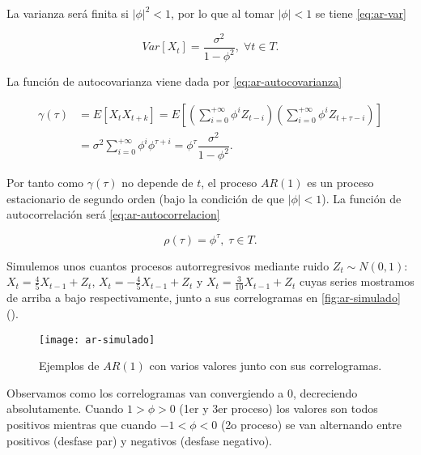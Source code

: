 La varianza será finita si $|\phi|^2 < 1$, por lo que al tomar $|\phi| < 1$ se tiene \eqref{eq:ar-var}

\begin{equation}
  Var[X_t] = \dfrac{\sigma^2}{1 - \phi^2}, \; \forall t \in T.
  \label{eq:ar-var}
\end{equation}

La función de autocovarianza viene dada por \eqref{eq:ar-autocovarianza}

\begin{equation}
  \begin{aligned}
    \gamma(\tau) & = E[X_t X_{t + k}] = E\left[\left(\sum \limits^{+\infty}_{i = 0} \phi^i Z_{t - i}\right)\left(\sum \limits^{+\infty}_{i = 0} \phi^i Z_{t + \tau - i}\right)\right] \\
    & = \sigma^2 \sum \limits^{+\infty}_{i = 0} \phi^i \phi^{\tau + i} = \phi^\tau \dfrac{\sigma^2}{1 - \phi^2}.
  \end{aligned}
  \label{eq:ar-autocovarianza}
\end{equation}

Por tanto como $\gamma(\tau)$ no depende de $t$, el proceso $AR(1)$ es un proceso estacionario de segundo orden (bajo la condición de que $|\phi| < 1$). La función de autocorrelación será \eqref{eq:ar-autocorrelacion}

\begin{equation}
  \rho(\tau) = \phi^\tau, \; \tau \in T.
  \label{eq:ar-autocorrelacion}
\end{equation}

Simulemos unos cuantos procesos autorregresivos mediante ruido $Z_t \sim N(0, 1)$: $X_t = \frac{4}{5}X_{t-1} + Z_t$, $X_t = -\frac{4}{5}X_{t-1} + Z_t$ y $X_t = \frac{3}{10}X_{t-1} + Z_t$ cuyas series mostramos de arriba a bajo respectivamente, junto a sus correlogramas en \autoref{fig:ar-simulado} (\cite{chatfield2019analysis}).

\begin{figure}[htpb]
  \centering
  \texttt{[image: ar-simulado]}
  \caption{Ejemplos de $AR(1)$ con varios valores junto con sus correlogramas.}
  \label{fig:ar-simulado}
\end{figure}

Observamos como los correlogramas van convergiendo a 0, decreciendo absolutamente. Cuando $1 > \phi > 0$ (1er y 3er proceso) los valores son todos positivos mientras que cuando $-1 < \phi < 0$ (2o proceso) se van alternando entre positivos (desfase par) y negativos (desfase negativo).

